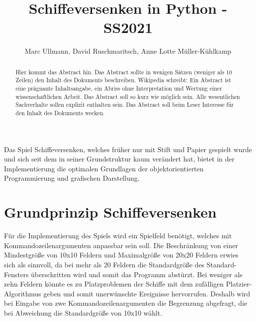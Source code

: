 \documentclass{llncs}
\begin{document}
%
%
%
\mainmatter              %
%
\title{Schiffeversenken in Python - SS2021}
%
\author{Marc Ullmann, David Ruschmaritsch, Anne Lotte Müller-Kühlkamp}
%

\maketitle              %

\begin{abstract}
Hier kommt das Abstract hin. Das Abstract sollte in wenigen Sätzen (weniger als 10 Zeilen) den Inhalt des Dokuments beschreiben. Wikipedia schreibt: Ein Abstract ist eine prägnante Inhaltsangabe, ein Abriss ohne Interpretation und Wertung einer wissenschaftlichen Arbeit. Das Abstract soll so kurz wie möglich sein. Alle wesentlichen Sachverhalte sollen explizit enthalten sein. Das Abstract soll beim Leser Interesse für den Inhalt des Dokuments wecken.
\end{abstract}

Das Spiel Schiffeversenken, welches früher nur mit Stift und Papier gespielt wurde und sich seit dem in seiner Grundstruktur kaum verändert hat, bietet in der Implementierung die optimalen Grundlagen der objektorientierten Programmierung und
grafischen Darstellung.

\section{Grundprinzip Schiffeversenken}

Für die Implementierung des Spiels wird ein Spielfeld benötigt, welches mit Kommandozeilenargumenten anpassbar sein soll. Die Beschränkung von einer Mindestgröße von 10x10 Feldern und Maximalgröße von 20x20
Feldern erwies sich als sinnvoll, da bei mehr als 20 Feldern die Standardgröße des Standard-Fensters überschritten wird und somit das Programm abstürzt.
Bei weniger als zehn Feldern könnte es zu Platzproblemen der Schiffe mit dem zufälligen Platzier-Algorithmus geben und somit unerwünschte Ereignisse hervorrufen.
Deshalb wird bei Eingabe von zwe Kommandozeilenargumenten die Begrenzung abgefragt, die bei Abweichung die Standardgröße von 10x10 wählt.
\end{document}
